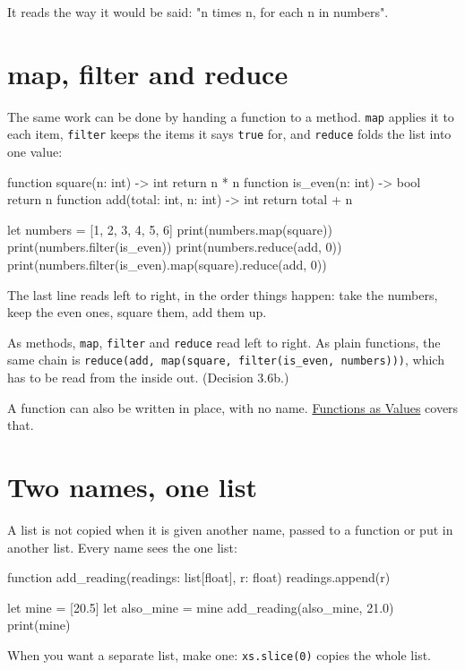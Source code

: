 It reads the way it would be said: "n times n, for each n in numbers".

\section{map, filter and reduce}

The same work can be done by handing a function to a method.
\verb|map| applies it to each item, \verb|filter| keeps the items it
says \verb|true| for, and \verb|reduce| folds the list into one value:

\begin{zeno}
function square(n: int) -> int {
    return n * n
}
function is_even(n: int) -> bool {
    return n %
}
function add(total: int, n: int) -> int {
    return total + n
}

let numbers = [1, 2, 3, 4, 5, 6]
print(numbers.map(square))
print(numbers.filter(is_even))
print(numbers.reduce(add, 0))
print(numbers.filter(is_even).map(square).reduce(add, 0))
\end{zeno}

The last line reads left to right, in the order things happen: take
the numbers, keep the even ones, square them, add them up.

\begin{why}
As methods, \verb|map|, \verb|filter| and \verb|reduce| read left to
right. As plain functions, the same chain is
\verb|reduce(add, map(square, filter(is_even, numbers)))|, which has to
be read from the inside out. (Decision 3.6b.)
\end{why}

A function can also be written in place, with no name.
\hyperref[ch-function-values]{Functions as Values} covers that.

\section{Two names, one list}

A list is not copied when it is given another name, passed to a
function or put in another list. Every name sees the one list:

\begin{zeno}
function add_reading(readings: list[float], r: float) {
    readings.append(r)
}

let mine = [20.5]
let also_mine = mine
add_reading(also_mine, 21.0)
print(mine)
\end{zeno}

When you want a separate list, make one: \verb|xs.slice(0)| copies the
whole list.

